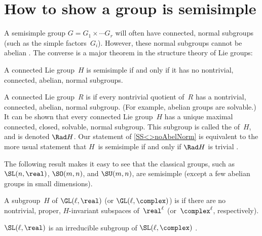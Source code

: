 \section{How to show a group is semisimple}

A semisimple group $G = G_1 \times \cdots G_r$ will often have
connected, normal subgroups (such as the simple
factors~$G_i$). However, these normal subgroups cannot be
abelian . The converse is a major
theorem in the structure theory of Lie groups:

\begin{thm} \label{SS<>noAbelNorm}
 A connected Lie group~$H$ is semisimple if and only if it
has no nontrivial, connected, abelian, normal subgroups.
 \end{thm}

\begin{rem}
 A connected Lie group~$R$ is  if every nontrivial quotient of~$R$ has a
nontrivial, connected, abelian, normal subgroup. (For
example, abelian groups are solvable.) It can be shown that
every connected Lie group~$H$ has a unique maximal connected,
closed, solvable, normal subgroup. This subgroup is called the
 of~$H$, and is
denoted $\Rad H$. Our statement of
\cref{SS<>noAbelNorm} is equivalent to the more usual
statement that $H$~is semisimple if and only if $\Rad H$ is
trivial . 
 \end{rem}


The following result makes it easy to see that the
classical groups, such as $\SL(n,\real)$, $\SO(m,n)$, and
$\SU(m,n)$, are semisimple (except a few abelian groups in
small dimensions).

\begin{defn} \label{irredrepDefn}
 A subgroup~$H$ of $\GL(\ell,\real)$ (or
$\GL(\ell,\complex)$) is  if there are no nontrivial,
proper, $H$-invariant subspaces of~$\real^\ell$
(or~$\complex^\ell$, respectively).
 \end{defn}

\begin{eg}
 $\SL(\ell,\real)$ is an irreducible subgroup of
$\SL(\ell,\complex)$ .
 \end{eg}

